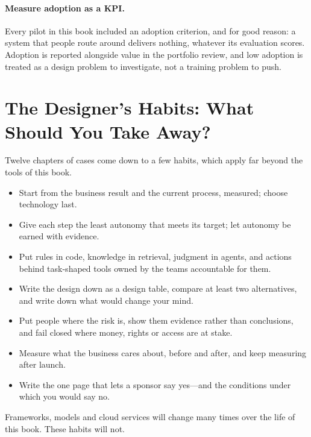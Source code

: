 \paragraph{Measure adoption as a KPI.} Every pilot in this book included an adoption criterion, and for good reason: a system that people route around delivers nothing, whatever its evaluation scores. Adoption is reported alongside value in the portfolio review, and low adoption is treated as a design problem to investigate, not a training problem to push.

\section{The Designer's Habits: What Should You Take Away?}
\label{sec:cap-habits}

Twelve chapters of cases come down to a few habits, which apply far beyond the tools of this book.

\begin{keyidea}
\begin{itemize}[leftmargin=*,itemsep=2pt]
  \item Start from the business result and the current process, measured; choose technology last.
  \item Give each step the least autonomy that meets its target; let autonomy be earned with evidence.
  \item Put rules in code, knowledge in retrieval, judgment in agents, and actions behind task-shaped tools owned by the teams accountable for them.
  \item Write the design down as a design table, compare at least two alternatives, and write down what would change your mind.
  \item Put people where the risk is, show them evidence rather than conclusions, and fail closed where money, rights or access are at stake.
  \item Measure what the business cares about, before and after, and keep measuring after launch.
  \item Write the one page that lets a sponsor say yes---and the conditions under which you would say no.
\end{itemize}
\end{keyidea}
Frameworks, models and cloud services will change many times over the life of this book. These habits will not.

